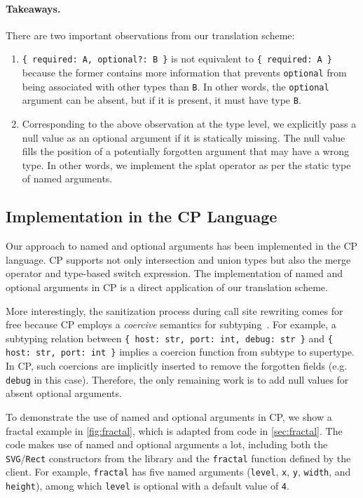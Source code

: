 \paragraph{Takeaways.}
There are two important observations from our translation scheme:
\begin{enumerate}
\item \lstinline|{ required: A, optional?: B }| is not equivalent to
      \lstinline|{ required: A }| because the former contains more information
      that prevents \lstinline{optional} from being associated with other types
      than \lstinline{B}. In other words, the \lstinline{optional} argument can
      be absent, but if it is present, it must have type \lstinline{B}.
\item Corresponding to the above observation at the type level, we explicitly
      pass a null value as an optional argument if it is statically missing. The
      null value fills the position of a potentially forgotten argument that may
      have a wrong type. In other words, we implement the splat operator as per
      the static type of named arguments.
\end{enumerate}

\subsection{Implementation in the CP Language}

Our approach to named and optional arguments has been implemented in the CP
language. CP supports not only intersection and union types but also the merge
operator and type-based switch expression. The implementation of named and
optional arguments in CP is a direct application of our translation scheme.

More interestingly, the sanitization process during call site rewriting comes
for free because CP employs a \emph{coercive} semantics for
subtyping~\citep{luo2013coercive}. For example, a subtyping relation between
\lstinline[language={[3]Python}]|{ host: str, port: int, debug: str }| and
\lstinline[language={[3]Python}]|{ host: str, port: int }| implies a coercion
function from subtype to supertype. In CP, such coercions are implicitly
inserted to remove the forgotten fields (e.g. \lstinline{debug} in this case).
Therefore, the only remaining work is to add null values for absent optional
arguments.

To demonstrate the use of named and optional arguments in CP, we show a fractal
example in \autoref{fig:fractal}, which is adapted from code in
\autoref{sec:fractal}. The code makes use of named and optional arguments a lot,
including both the \lstinline{SVG}/\lstinline{Rect} constructors from the
library and the \lstinline{fractal} function defined by the client. For example,
\lstinline{fractal} has five named arguments (\lstinline{level}, \lstinline{x},
\lstinline{y}, \lstinline{width}, and \lstinline{height}), among which
\lstinline{level} is optional with a default value of \lstinline{4}.

